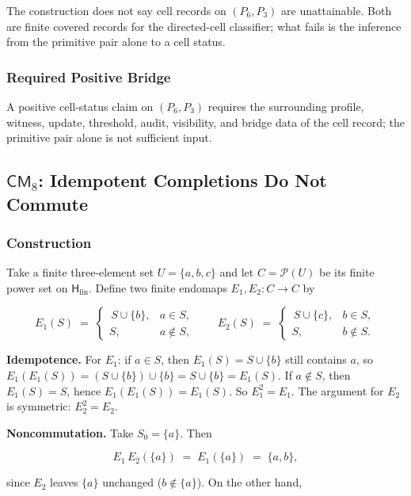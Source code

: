 \documentclass[11pt]{article}
\theoremstyle{definition}
\begin{document}
The construction does not say cell records on \((P_6,P_3)\) are unattainable. Both are finite covered records for the directed-cell classifier; what fails is the inference from the primitive pair alone to a cell status.

\subsubsection{Required Positive Bridge}

A positive cell-status claim on \((P_6,P_3)\) requires the surrounding profile, witness, update, threshold, audit, visibility, and bridge data of the cell record; the primitive pair alone is not sufficient input.

\subsection{\texorpdfstring{\(\mathsf{CM}_8\): Idempotent Completions Do Not Commute}{C.9 \textbackslash mathsf\{CM\}\_8: Idempotent Completions Do Not Commute}}

\subsubsection{Construction}

Take a finite three-element set \(U=\{a,b,c\}\) and let \(C=\mathcal P(U)\) be its finite power set on \(\mathsf H_{\mathrm{fin}}\). Define two finite endomaps \(E_1,E_2:C\to C\) by

\[
E_1(S)\;=\;\begin{cases}\,S\cup\{b\}, & a\in S,\\[2pt] S, & a\notin S,\end{cases}\qquad E_2(S)\;=\;\begin{cases}\,S\cup\{c\}, & b\in S,\\[2pt] S, & b\notin S.\end{cases}
\]

\textbf{Idempotence.} For \(E_1\): if \(a\in S\), then \(E_1(S)=S\cup\{b\}\) still contains \(a\), so \(E_1(E_1(S))=(S\cup\{b\})\cup\{b\}=S\cup\{b\}=E_1(S)\). If \(a\notin S\), then \(E_1(S)=S\), hence \(E_1(E_1(S))=E_1(S)\). So \(E_1^2=E_1\). The argument for \(E_2\) is symmetric: \(E_2^2=E_2\).

\textbf{Noncommutation.} Take \(S_0=\{a\}\). Then

\[
E_1\,E_2(\{a\})\;=\;E_1(\{a\})\;=\;\{a,b\},
\]

since \(E_2\) leaves \(\{a\}\) unchanged (\(b\notin\{a\}\)). On the other hand,
\end{document}
